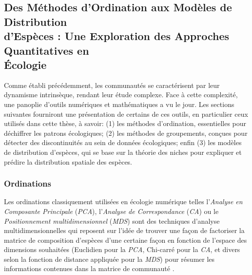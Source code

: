 \begin{refsection}
\hypertarget{des-muxe9thodes-dordination-aux-moduxe8les-de-distribution-despuxe8ces-une-exploration-des-approches-quantitatives-en-uxe9cologie}{%
\subsection{Des Méthodes d'Ordination aux Modèles de Distribution \\
d'Espèces : Une Exploration des Approches Quantitatives en \\
Écologie}\label{des-muxe9thodes-dordination-aux-moduxe8les-de-distribution-despuxe8ces-une-exploration-des-approches-quantitatives-en-uxe9cologie}}

Comme établi précédemment, les communautés se caractérisent par leur
dynamisme intrinsèque, rendant leur étude complexe. Face à cette
complexité, une panoplie d'outils numériques et mathématiques a vu le
jour. Les sections suivantes fourniront une présentation de certains de
ces outils, en particulier ceux utilisés dans cette thèse, à savoir: (1)
les méthodes d'ordination, essentielles pour déchiffrer les patrons
écologiques; (2) les méthodes de groupements, conçues pour détecter des
discontinuités au sein de données écologiques; enfin (3) les modèles de
distribution d'espèces, qui se base sur la théorie des niches pour
expliquer et prédire la distribution spatiale des espèces.

\hypertarget{ordinations}{%
\subsubsection{Ordinations}\label{ordinations}}

Les ordinations classiquement utilisées en écologie numérique telles
l'\emph{Analyse en Composante Principale} (\emph{PCA}), l'\emph{Analyse
de Correspondance} (\emph{CA}) ou le \emph{Positionnement
multidimensionnel} (\emph{MDS}) sont des techniques d'analyse
multidimensionnelles qui reposent sur l'idée de trouver une façon de
factoriser la matrice de composition d'espèces d'une certaine façon en
fonction de l'espace des dimensions souhaitées (Euclidien pour la
\emph{PCA}, Chi-carré pour la \emph{CA}, et divers selon la fonction de
distance appliquée pour la \emph{MDS}) pour résumer les informations
contenues dans la matrice de communauté \autocites[
]{Legendre_2012}{Udell_2015}.


\end{refsection}
